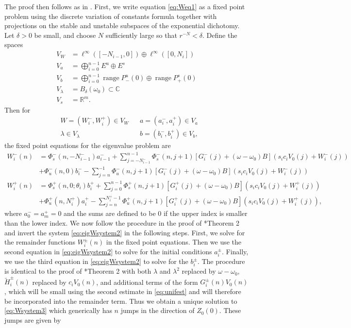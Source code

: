 \documentclass[12pt,reqno]{amsart}
\def\R{{\mathbb R}}
\def\C{{\mathbb C}}
\DeclareMathOperator{\ran}{range}
\begin{document}
The proof then follows as in \cites{Parker2020,Sandstede1998}. First, we write equation \cref{eq:Weq1} as a fixed point problem using the discrete variation of constants formula together with projections on the stable and unstable subspaces of the exponential dichotomy. Let $\delta > 0$ be small, and choose $N$ sufficiently large so that $r^{-N} < \delta$. Define the spaces
\begin{align*}
V_W &= \ell^\infty([-N_{i-1}, 0]) \oplus \ell^\infty([0, N_i])  \\
V_a &= \bigoplus_{i=0}^{n-1} E^u \oplus E^s \\
V_b &= \bigoplus_{i=0}^{n-1} \ran P_-^u(0) \oplus \ran P_+^s(0)\\
V_\lambda &= B_\delta(\omega_0) \subset \C \\
V_s &= \R^m.
\end{align*}
Then for
\begin{align*}
&W = (W_i^-, W_i^+) \in V_W  && a = (a_i^-, a_i^+) \in V_a \\
&\lambda \in V_\lambda  &&b = (b_i^-, b_i^+) \in V_b,
\end{align*}
the fixed point equations for the eigenvalue problem are
\begin{equation*}\label{fpeig}
\begin{aligned}
W_i^-(n) &= 
\Phi_s^-(n, -N_{i-1}^-) a_{i-1}^- + \sum_{j = -N_{i-1}^-}^{n-1} \Phi_s^-(n, j+1)
[G_i^-(j) + (\omega - \omega_0) B](s_i c_i V_0(j) + W_i^-(j))
 \\
&+ \Phi_u^-(n, 0) b_i^- - \sum_{j = n}^{-1} \Phi_u^-(n, j+1) 
[G_i^-(j) + (\omega - \omega_0) B](s_i c_i V_0(j) + W_i^-(j))\\
W_i^+(n) &= \Phi_s^+(n, 0; \theta_i) b_i^+ + \sum_{j = 0}^{n-1} \Phi_s^+(n, j+1) 
[G_i^+(j) + (\omega - \omega_0) B](s_i c_i V_0(j) + W_i^+(j))\\
&+ \Phi_u^+(n, N_i^+) a_i^+ - \sum_{j = n}^{N_i^+-1} \Phi_u^+(n, j+1) 
[G_i^+(j) + (\omega - \omega_0) B](s_i c_i V_0(j) + W_i^+(j)),
\end{aligned}
\end{equation*}
where $a_0^- = a_m^+ = 0$ and the sums are defined to be $0$ if the upper index is smaller than the lower index. We now follow the procedure in the proof of \cite{Parker2020}*{Theorem 2} and invert the system \cref{eq:eigWsystem2} in the following steps. First, we solve for the remainder functions $W_i^\pm(n)$ in the fixed point equations. Then we use the second equation in \cref{eq:eigWsystem2} to solve for the  initial conditions $a_i^\pm$. Finally, we use the third equation in \cref{eq:eigWsystem2} to solve for the $b_i^\pm$. The procedure is identical to the proof of \cite{Parker2020}*{Theorem 2} with both $\lambda$ and $\lambda^2$ replaced by $\omega - \omega_0$, $\tilde{H}_i^\pm(n)$ replaced by $c_i V_0(n)$, and additional terms of the form $G_i^\pm(n) V_0(n)$, which will be small using the second estimate in \cref{eq:unifest} and will therefore be incorporated into the remainder term. Thus we obtain a unique solution to \cref{eq:Wsystem3} which generically has $n$ jumps in the direction of $Z_0(0)$. These jumps are given by 
\end{document}
